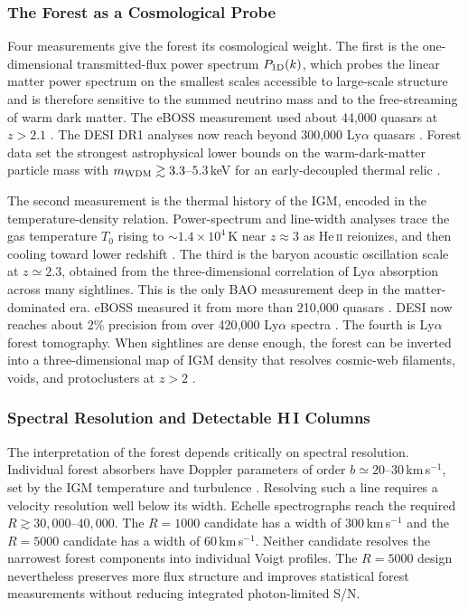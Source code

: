 \subsubsection{The Forest as a Cosmological Probe}

Four measurements give the forest its cosmological weight. The first is the one-dimensional transmitted-flux power spectrum $P_{\rm 1D}(k)$, which probes the linear matter power spectrum on the smallest scales accessible to large-scale structure and is therefore sensitive to the summed neutrino mass and to the free-streaming of warm dark matter. The eBOSS measurement used about 44{,}000 quasars at $z>2.1$ \cite{chabanier2019}. The DESI DR1 analyses now reach beyond 300{,}000 Ly$\alpha$ quasars \cite{karacayli2025,ravoux2025}. Forest data set the strongest astrophysical lower bounds on the warm-dark-matter particle mass with $m_{\rm WDM}\gtrsim3.3$--$5.3$\,keV for an early-decoupled thermal relic \cite{viel2013,irsic2017}.

The second measurement is the thermal history of the IGM, encoded in the temperature-density relation. Power-spectrum and line-width analyses trace the gas temperature $T_0$ rising to $\sim1.4\times10^4$\,K near $z\approx3$ as He\,\textsc{ii} reionizes, and then cooling toward lower redshift \cite{walther2019,gaikwad2021}. The third is the baryon acoustic oscillation scale at $z\simeq2.3$, obtained from the three-dimensional correlation of Ly$\alpha$ absorption across many sightlines. This is the only BAO measurement deep in the matter-dominated era. eBOSS measured it from more than 210{,}000 quasars \cite{dumasdesbourboux2020}. DESI now reaches about 2\% precision from over 420{,}000 Ly$\alpha$ spectra \cite{desi2024lya}. The fourth is Ly$\alpha$ forest tomography. When sightlines are dense enough, the forest can be inverted into a three-dimensional map of IGM density that resolves cosmic-web filaments, voids, and protoclusters at $z>2$ \cite{lee2018clamato,newman2020latis}.

\subsubsection{Spectral Resolution and Detectable H\,I Columns}\label{sec:lyaresolution}

The interpretation of the forest depends critically on spectral resolution. Individual forest absorbers have Doppler parameters of order $b\simeq20$--$30$\,km\,s$^{-1}$, set by the IGM temperature and turbulence \cite{rudie2012,rudie2013}. Resolving such a line requires a velocity resolution well below its width. Echelle spectrographs reach the required $R\gtrsim30{,}000$--$40{,}000$. The $R=1000$ candidate has a width of $300$\,km\,s$^{-1}$ and the $R=5000$ candidate has a width of $60$\,km\,s$^{-1}$. Neither candidate resolves the narrowest forest components into individual Voigt profiles. The $R=5000$ design nevertheless preserves more flux structure and improves statistical forest measurements without reducing integrated photon-limited S/N.

